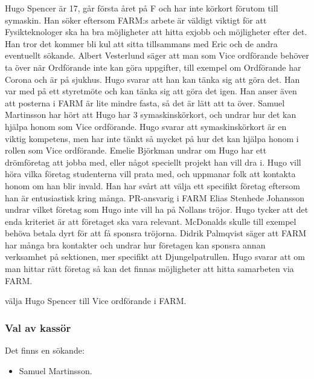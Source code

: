\documentclass[hidelinks]{sektionsmote} %
\begin{document}
Hugo Spencer är 17, går första året på F och har inte körkort förutom till symaskin.
Han söker eftersom FARM:s arbete är väldigt viktigt för att Fysikteknologer ska ha bra möjligheter att hitta exjobb och möjligheter efter det.
Han tror det kommer bli kul att sitta tillsammans med Eric och de andra eventuellt sökande.
Albert Vesterlund säger att man som Vice ordförande behöver ta över när Ordförande inte kan göra uppgifter, till exempel om Ordförande har Corona och är på sjukhus.
Hugo svarar att han kan tänka sig att göra det.
Han var med på ett styretmöte och kan tänka sig att göra det igen.
Han anser även att posterna i FARM är lite mindre fasta, så det är lätt att ta över.
Samuel Martinsson har hört att Hugo har 3 symaskinskörkort, och undrar hur det kan hjälpa honom som Vice ordförande.
Hugo svarar att symaskinskörkort är en viktig kompetens, men har inte tänkt så mycket på hur det kan hjälpa honom i rollen som Vice ordförande.
Emelie Björkman undrar om Hugo har ett drömföretag att jobba med, eller något speciellt projekt han vill dra i.
Hugo vill höra vilka företag studenterna vill prata med, och uppmanar folk att kontakta honom om han blir invald.
Han har svårt att välja ett specifikt företag eftersom han är entusiastisk kring många.
PR-ansvarig i FARM Elias Stenhede Johansson undrar vilket företag som Hugo inte vill ha på Nollans tröjor.
Hugo tycker att det enda kriteriet är att företaget ska vara relevant.
McDonalds skulle till exempel behöva betala dyrt för att få sponsra tröjorna.
Didrik Palmqvist säger att FARM har många bra kontakter och undrar hur företagen kan sponsra annan verksamhet på sektionen, mer specifikt att Djungelpatrullen.
Hugo svarar att om man hittar rätt företag så kan det finnas möjligheter att hitta samarbeten via FARM.

\begin{beslut}
  \item välja Hugo Spencer till Vice ordförande i FARM.
\end{beslut}

\subsubsection{Val av kassör}
Det finns en sökande:
\begin{itemize}
    \item Samuel Martinsson.
\end{itemize}
\end{document}
